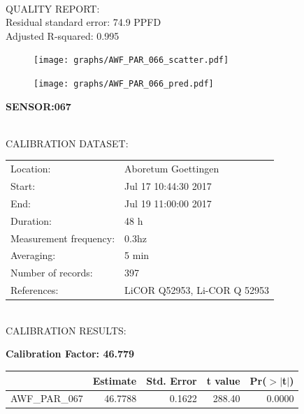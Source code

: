 \documentclass[oneside]{report}
\begin{document}
\hrulefill\\
QUALITY REPORT:\\
Residual standard error: 74.9 PPFD\\
Adjusted R-squared: 0.995



\begin{figure}[H]
  \centering
  \texttt{[image: graphs/AWF\_PAR\_066\_scatter.pdf]}
\end{figure}




\begin{figure}[H]
  \centering
  \texttt{[image: graphs/AWF\_PAR\_066\_pred.pdf]}
\end{figure}

\pagebreak


\begin{center}
\large{\textbf{SENSOR:067}}\\
\end{center}

\hrulefill\\
CALIBRATION DATASET:\\
\begin{table}[h!]
  \centering
  \label{tab:table1}
  \begin{tabular}{ll}
    Location: & Aboretum Goettingen\\ 
    
    
    Start:  & Jul 17 10:44:30 2017 \\
    End:   & Jul 19 11:00:00 2017\\ 
    Duration: & 48 h\\
    Measurement frequency: & 0.3hz\\
    Averaging:  &5 min\\
    Number of records: & 397 \\
    References: & LiCOR Q52953, Li-COR Q 52953 \\
  \end{tabular}
\end{table}

\hrulefill\\
CALIBRATION RESULTS:\\


\begin{center}
\textbf{\large{Calibration Factor: 46.779}}\\
\end{center}
\begin{table}[ht]
\centering
\begin{tabular}{rrrrr}
  \hline
 & Estimate & Std. Error & t value & Pr($>$$|$t$|$) \\ 
  \hline
AWF\_PAR\_067 & 46.7788 & 0.1622 & 288.40 & 0.0000 \\ 
   \hline
\end{tabular}
\end{table}
\end{document}

